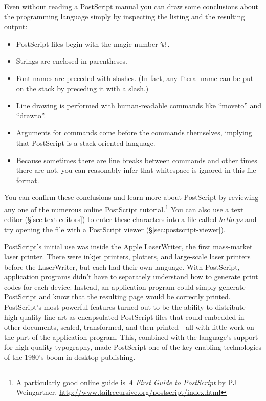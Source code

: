 

Even without reading a PostScript manual you
can draw some conclusions about the programming language simply by 
inspecting the listing and the resulting output:

\begin{itemize}
\item PostScript files begin with the magic number \verb|%!|.
\item Strings are enclosed in parentheses. 
\item Font names are preceded with slashes. (In fact, any literal name
  can be put on the stack by preceding it with a slash.)
\item Line drawing is performed with human-readable commands like
  ``moveto'' and ``drawto''. 
\item Arguments for commands come before the commands themselves,
  implying that PostScript is a stack-oriented language.
\item Because sometimes there are line breaks between commands and
  other times there are not, you can reasonably infer that whitespace
  is ignored in this file format.
\end{itemize}

You can confirm these conclusions and learn more about PostScript by
reviewing any one of the numerous online PostScript
tutorial.\footnote{A particularly good online guide is \emph{A First
    Guide to PostScript} by PJ
  Weingartner. \url{http://www.tailrecursive.org/postscript/index.html}}
You can also use a text editor (\S\ref{sec:text-editors}) to enter
these characters into a file called \emph{hello.ps} and try opening
the file with a PostScript viewer (\S\ref{sec:postscript-viewer}).

PostScript's initial use was inside the Apple LaserWriter, the first
mass-market laser printer. There were inkjet printers, plotters, and
large-scale laser printers before the LaserWriter, but each had their
own language. With PostScript, application programs didn't have to
separately understand how to generate print codes for each
device. Instead, an application program could simply generate
PostScript and know that the resulting page would be correctly
printed. PostScript's most powerful features turned out to be the
ability to distribute high-quality line art as encapsulated PostScript
files that could embedded in other documents, scaled, transformed, and
then printed---all with little work on the part of the application
program. This, combined with the language's support for high quality
typography, made PostScript one of the key enabling technologies of
the 1980's boom in desktop publishing.

